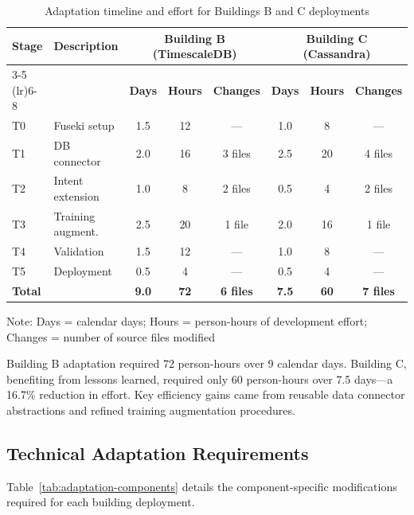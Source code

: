 \documentclass[acmlarge]{acmart}
\begin{document}
\begin{table}[h]
\centering
\begin{threeparttable}
\caption{Adaptation timeline and effort for Buildings B and C deployments}
\label{tab:adaptation-timeline}
\scriptsize
\begin{tabular}{@{}llcccccc@{}}
\toprule
\multirow{2}{*}{\textbf{Stage}} & \multirow{2}{*}{\textbf{Description}} & \multicolumn{3}{c}{\textbf{Building B (TimescaleDB)}} & \multicolumn{3}{c}{\textbf{Building C (Cassandra)}} \\
\cmidrule(lr){3-5} \cmidrule(lr){6-8}
 & & \textbf{Days} & \textbf{Hours} & \textbf{Changes} & \textbf{Days} & \textbf{Hours} & \textbf{Changes} \\
\midrule
T0 & Fuseki setup & 1.5 & 12 & — & 1.0 & 8 & — \\
T1 & DB connector & 2.0 & 16 & 3 files & 2.5 & 20 & 4 files \\
T2 & Intent extension & 1.0 & 8 & 2 files & 0.5 & 4 & 2 files \\
T3 & Training augment. & 2.5 & 20 & 1 file & 2.0 & 16 & 1 file \\
T4 & Validation & 1.5 & 12 & — & 1.0 & 8 & — \\
T5 & Deployment & 0.5 & 4 & — & 0.5 & 4 & — \\
\midrule
\textbf{Total} & & \textbf{9.0} & \textbf{72} & \textbf{6 files} & \textbf{7.5} & \textbf{60} & \textbf{7 files} \\
\bottomrule
\end{tabular}
\begin{tablenotes}
\small
\item Note: Days = calendar days; Hours = person-hours of development effort; Changes = number of source files modified
\end{tablenotes}
\end{threeparttable}
\end{table}

Building B adaptation required 72 person-hours over 9 calendar days. Building C, benefiting from lessons learned, required only 60 person-hours over 7.5 days—a 16.7\% reduction in effort. Key efficiency gains came from reusable data connector abstractions and refined training augmentation procedures.

\subsection{Technical Adaptation Requirements}

Table~\ref{tab:adaptation-components} details the component-specific modifications required for each building deployment.
\end{document}
